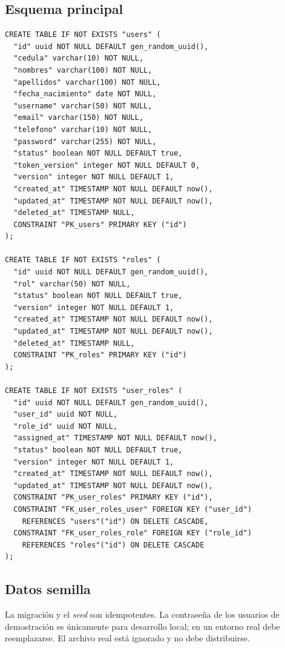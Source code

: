 \documentclass[11pt,a4paper]{article}
\newcommand{\code}[1]{\texttt{\detokenize{#1}}}
\newcommand{\term}[1]{\textit{#1}}
\begin{document}
\subsection{Esquema principal}

\begin{lstlisting}[caption={Extracto de \code{ms-auth-nestjs/src/database/migrations/1700000000000-InitialSchema.ts}.},label={lst:sql}]
CREATE TABLE IF NOT EXISTS "users" (
  "id" uuid NOT NULL DEFAULT gen_random_uuid(),
  "cedula" varchar(10) NOT NULL,
  "nombres" varchar(100) NOT NULL,
  "apellidos" varchar(100) NOT NULL,
  "fecha_nacimiento" date NOT NULL,
  "username" varchar(50) NOT NULL,
  "email" varchar(150) NOT NULL,
  "telefono" varchar(10) NOT NULL,
  "password" varchar(255) NOT NULL,
  "status" boolean NOT NULL DEFAULT true,
  "token_version" integer NOT NULL DEFAULT 0,
  "version" integer NOT NULL DEFAULT 1,
  "created_at" TIMESTAMP NOT NULL DEFAULT now(),
  "updated_at" TIMESTAMP NOT NULL DEFAULT now(),
  "deleted_at" TIMESTAMP NULL,
  CONSTRAINT "PK_users" PRIMARY KEY ("id")
);

CREATE TABLE IF NOT EXISTS "roles" (
  "id" uuid NOT NULL DEFAULT gen_random_uuid(),
  "rol" varchar(50) NOT NULL,
  "status" boolean NOT NULL DEFAULT true,
  "version" integer NOT NULL DEFAULT 1,
  "created_at" TIMESTAMP NOT NULL DEFAULT now(),
  "updated_at" TIMESTAMP NOT NULL DEFAULT now(),
  "deleted_at" TIMESTAMP NULL,
  CONSTRAINT "PK_roles" PRIMARY KEY ("id")
);

CREATE TABLE IF NOT EXISTS "user_roles" (
  "id" uuid NOT NULL DEFAULT gen_random_uuid(),
  "user_id" uuid NOT NULL,
  "role_id" uuid NOT NULL,
  "assigned_at" TIMESTAMP NOT NULL DEFAULT now(),
  "status" boolean NOT NULL DEFAULT true,
  "version" integer NOT NULL DEFAULT 1,
  "created_at" TIMESTAMP NOT NULL DEFAULT now(),
  "updated_at" TIMESTAMP NOT NULL DEFAULT now(),
  CONSTRAINT "PK_user_roles" PRIMARY KEY ("id"),
  CONSTRAINT "FK_user_roles_user" FOREIGN KEY ("user_id")
    REFERENCES "users"("id") ON DELETE CASCADE,
  CONSTRAINT "FK_user_roles_role" FOREIGN KEY ("role_id")
    REFERENCES "roles"("id") ON DELETE CASCADE
);
\end{lstlisting}

\subsection{Datos semilla}

La migración y el \term{seed} son idempotentes. La contraseña de los usuarios de
demostración es \code{ClaveSegura2026!} únicamente para desarrollo local; en un
entorno real debe reemplazarse. El archivo \code{.env} real está ignorado y no debe
distribuirse.
\end{document}
